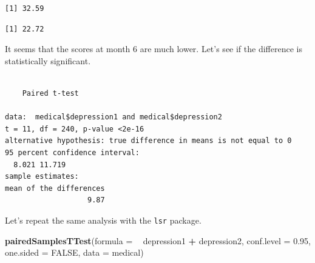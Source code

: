 \documentclass[]{book}
\newenvironment{Shaded}{\begin{snugshade}}{\end{snugshade}}
\newcommand{\DataTypeTok}[1]{\textcolor[rgb]{0.13,0.29,0.53}{#1}}
\newcommand{\FloatTok}[1]{\textcolor[rgb]{0.00,0.00,0.81}{#1}}
\newcommand{\KeywordTok}[1]{\textcolor[rgb]{0.13,0.29,0.53}{\textbf{#1}}}
\newcommand{\NormalTok}[1]{#1}
\newcommand{\OperatorTok}[1]{\textcolor[rgb]{0.81,0.36,0.00}{\textbf{#1}}}
\newcommand{\OtherTok}[1]{\textcolor[rgb]{0.56,0.35,0.01}{#1}}
\newcommand{\StringTok}[1]{\textcolor[rgb]{0.31,0.60,0.02}{#1}}
\begin{document}
\begin{verbatim}
[1] 32.59
\end{verbatim}

\begin{Shaded}
\end{Shaded}

\begin{verbatim}
[1] 22.72
\end{verbatim}

It seems that the scores at month 6 are much lower. Let's see if the difference is statistically significant.

\begin{Shaded}
\end{Shaded}

\begin{verbatim}

    Paired t-test

data:  medical$depression1 and medical$depression2
t = 11, df = 240, p-value <2e-16
alternative hypothesis: true difference in means is not equal to 0
95 percent confidence interval:
  8.021 11.719
sample estimates:
mean of the differences 
                   9.87 
\end{verbatim}

Let's repeat the same analysis with the \texttt{lsr} package.

\begin{Shaded}
\begin{Highlighting}[]
\KeywordTok{pairedSamplesTTest}\NormalTok{(}\DataTypeTok{formula =} \OperatorTok{~}\StringTok{ }\NormalTok{depression1 }\OperatorTok{+}\StringTok{ }\NormalTok{depression2,}
                   \DataTypeTok{conf.level =} \FloatTok{0.95}\NormalTok{,}
                   \DataTypeTok{one.sided =} \OtherTok{FALSE}\NormalTok{, }
                   \DataTypeTok{data =}\NormalTok{ medical)}
\end{Highlighting}
\end{Shaded}
\end{document}
